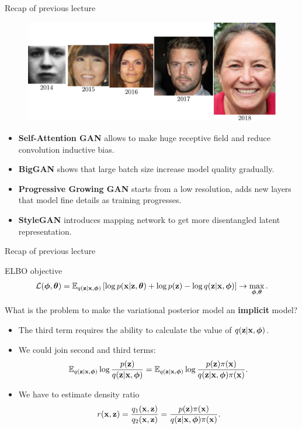 \begin{frame}{Recap of previous lecture}
	\begin{figure}
		\centering
		\includegraphics[width=\linewidth]{figs/gan_evolution}
	\end{figure}
	\begin{itemize}
		\item \textbf{Self-Attention GAN} allows to make huge receptive field and reduce convolution inductive bias.
		\item \textbf{BigGAN} shows that large batch size increase model quality gradually.
		\item \textbf{Progressive Growing GAN} starts from a low resolution, adds new layers that model fine details as training progresses.
		\item \textbf{StyleGAN}  introduces mapping network to get more disentangled latent representation.
	\end{itemize}
\end{frame}
\begin{frame}{Recap of previous lecture}
	\begin{block}{ELBO objective}
		\vspace{-0.5cm}
		\[
			 \mathcal{L} (\boldsymbol{\phi}, \boldsymbol{\theta})  = \mathbb{E}_{q(\mathbf{z} | \mathbf{x}, \boldsymbol{\phi})} \left[\log p(\mathbf{x} | \mathbf{z}, \boldsymbol{\theta}) + \log p(\mathbf{z}) - \log q(\mathbf{z}| \mathbf{x}, \boldsymbol{\phi}) \right] \rightarrow \max_{\boldsymbol{\phi}, \boldsymbol{\theta}}.
		\]	
		\vspace{-0.5cm}
	\end{block}
	What is the problem to make the variational posterior model an \textbf{implicit} model?
	\begin{itemize}
	\item The third term requires the ability to calculate the value of $q(\mathbf{z} | \mathbf{x}, \boldsymbol{\phi})$.
	\item We could join second and third terms:
		\vspace{-0.2cm}
		\[
			\mathbb{E}_{q(\mathbf{z} | \mathbf{x}, \boldsymbol{\phi})} \log \frac{p(\mathbf{z})}{q(\mathbf{z}| \mathbf{x}, \boldsymbol{\phi})} = \mathbb{E}_{q(\mathbf{z} | \mathbf{x}, \boldsymbol{\phi})} \log \frac{p(\mathbf{z}) \pi(\mathbf{x})}{q(\mathbf{z}| \mathbf{x}, \boldsymbol{\phi}) \pi (\mathbf{x})}.
		\]
		\vspace{-0.5cm}
	\item We have to estimate density ratio 
		\vspace{-0.2cm}
		\[
			r(\mathbf{x}, \mathbf{z}) = \frac{q_1(\mathbf{x}, \mathbf{z})}{q_2(\mathbf{x}, \mathbf{z})} = \frac{p(\mathbf{z}) \pi(\mathbf{x})}{q(\mathbf{z}| \mathbf{x}, \boldsymbol{\phi}) \pi (\mathbf{x})}.
		\] 
	\end{itemize}
\end{frame}
